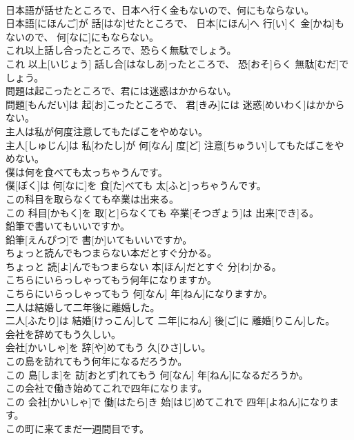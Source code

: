 \documentclass[8pt]{extreport}
\begin{document}
\begin{CJK}{UTF8}{min}
\\	日本語が話せたところで、日本へ行く金もないので、何にもならない。	
\\	日本語[にほんご]が 話[はな]せたところで、 日本[にほん]へ 行[い]く 金[かね]もないので、 何[なに]にもならない。
\\	これ以上話し合ったところで、恐らく無駄でしょう。	
\\	これ 以上[いじょう] 話し合[はなしあ]ったところで、 恐[おそ]らく 無駄[むだ]でしょう。
\\	問題は起こったところで、君には迷惑はかからない。	
\\	問題[もんだい]は 起[お]こったところで、 君[きみ]には 迷惑[めいわく]はかからない。
\\	主人は私が何度注意してもたばこをやめない。	
\\	主人[しゅじん]は 私[わたし]が 何[なん] 度[ど] 注意[ちゅうい]してもたばこをやめない。
\\	僕は何を食べても太っちゃうんです。	
\\	僕[ぼく]は 何[なに]を 食[た]べても 太[ふと]っちゃうんです。
\\	この科目を取らなくても卒業は出来る。	
\\	この 科目[かもく]を 取[と]らなくても 卒業[そつぎょう]は 出来[でき]る。
\\	鉛筆で書いてもいいですか。	
\\	鉛筆[えんぴつ]で 書[か]いてもいいですか。
\\	ちょっと読んでもつまらない本だとすぐ分かる。	
\\	ちょっと 読[よ]んでもつまらない 本[ほん]だとすぐ 分[わ]かる。
\\	こちらにいらっしゃってもう何年になりますか。	
\\	こちらにいらっしゃってもう 何[なん] 年[ねん]になりますか。
\\	二人は結婚して二年後に離婚した。	
\\	二人[ふたり]は 結婚[けっこん]して 二年[にねん] 後[ご]に 離婚[りこん]した。
\\	会社を辞めてもう久しい。	
\\	会社[かいしゃ]を 辞[や]めてもう 久[ひさ]しい。
\\	この島を訪れてもう何年になるだろうか。	
\\	この 島[しま]を 訪[おとず]れてもう 何[なん] 年[ねん]になるだろうか。
\\	この会社で働き始めてこれで四年になります。	
\\	この 会社[かいしゃ]で 働[はたら]き 始[はじ]めてこれで 四年[よねん]になります。
\\	この町に来てまだ一週間目です。	

\end{CJK}
\end{document}
